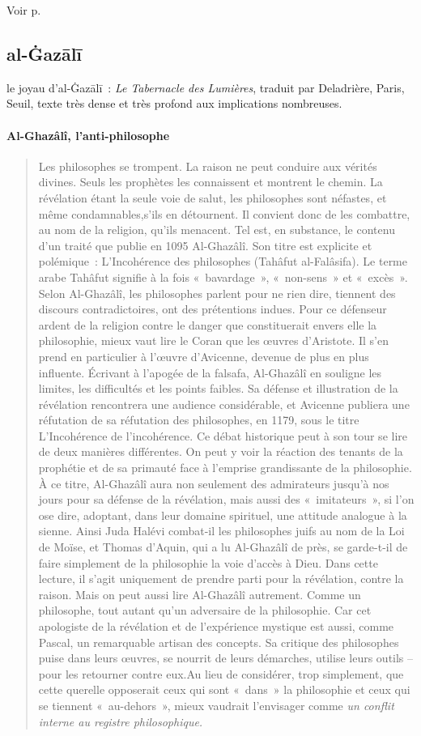 Voir p. \pageref{Theo:Avicenne1}


\subsection{al-Ġazālī}

le joyau d'al-Ġazālī~: \emph{Le Tabernacle des Lumières}, traduit
par Deladrière, Paris, Seuil, texte très dense et très profond aux
implications nombreuses.
\paragraph{Al-Ghazâlî, l’anti-philosophe} 
\begin{quote}
Les philosophes se trompent. La raison ne peut conduire aux vérités divines. Seuls les prophètes les connaissent et montrent le chemin. La révélation étant la seule voie de salut, les philosophes sont néfastes, et même condamnables,s’ils en détournent. Il convient donc de les combattre, au nom de la religion, qu’ils menacent. Tel est, en substance, le contenu d’un traité que publie en 1095 Al-Ghazâlî. Son titre est explicite et polémique : L’Incohérence des philosophes (Tahâfut al-Falâsifa). Le terme arabe Tahâfut signifie à la fois « bavardage », « non-sens » et « excès ». Selon Al-Ghazâlî, les philosophes parlent pour ne rien dire, tiennent des discours contradictoires, ont des prétentions indues. Pour ce défenseur ardent de la religion contre le danger que constituerait envers elle la philosophie, mieux vaut lire le Coran que les œuvres d’Aristote. Il s’en prend en particulier à l’œuvre d’Avicenne, devenue de plus en plus influente. Écrivant à l’apogée de la falsafa, Al-Ghazâlî en souligne les limites, les difficultés et les points faibles. Sa défense et illustration de la révélation rencontrera une audience considérable, et Avicenne publiera une réfutation de sa réfutation des philosophes, en 1179, sous le titre L’Incohérence de l’incohérence. Ce débat historique peut à son tour se lire de deux manières différentes. On peut y voir la réaction des tenants de la prophétie et de sa primauté face à l’emprise grandissante de la philosophie. À ce titre, Al-Ghazâlî aura non seulement des admirateurs jusqu’à nos jours pour sa défense de la révélation, mais aussi des « imitateurs », si l’on ose dire, adoptant, dans leur domaine spirituel, une attitude analogue à la sienne. Ainsi Juda Halévi combat-il les philosophes juifs au nom de la Loi de Moïse, et Thomas d’Aquin, qui a lu Al-Ghazâlî de près, se garde-t-il de faire simplement de la philosophie la voie d’accès à Dieu. Dans cette lecture, il s’agit uniquement de prendre parti pour la révélation, contre la raison. Mais on peut aussi lire Al-Ghazâlî autrement. Comme un philosophe, tout autant qu’un adversaire de la philosophie. Car cet apologiste de la révélation et de l’expérience mystique est aussi, comme Pascal, un remarquable artisan des concepts. Sa critique des philosophes puise dans leurs œuvres, se nourrit de leurs démarches, utilise leurs outils – pour les retourner contre eux.Au lieu de considérer, trop simplement, que cette querelle opposerait ceux qui sont « dans » la philosophie et ceux qui se tiennent « au-dehors », mieux vaudrait l’envisager comme \emph{un conflit interne au registre philosophique.}

\end{quote}
